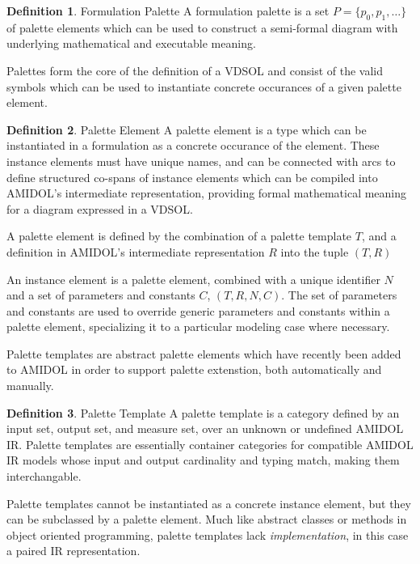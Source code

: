 \documentclass[11pt]{article}
\theoremstyle{definition}
\newtheorem{definition}{Definition}[section]
\newcommand{\amidol}{\textsc{AMIDOL}}
\begin{document}
\begin{definition}{Formulation Palette}
  A formulation palette is a set $P = \{ p_0, p_1, \ldots\}$ of
  palette elements which can be used to construct a semi-formal
  diagram with underlying mathematical and executable meaning.
\end{definition}

Palettes form the core of the definition of a VDSOL and consist of
the valid symbols which can be used to instantiate concrete occurances
of a given palette element.

\begin{definition}{Palette Element}
  A palette element is a type which can be instantiated in a
  formulation as a concrete occurance of the element.  These instance
  elements must have unique names, and can be connected with arcs to
  define structured co-spans of instance elements which can be
  compiled into \amidol{}'s intermediate representation, providing
  formal mathematical meaning for a diagram expressed in a VDSOL.

  A palette element is defined by the combination of a palette
  template $T$, and a definition in \amidol{}'s intermediate
  representation $R$ into the tuple $(T,R)$

  An instance element is a palette element, combined with a unique
  identifier $N$ and a set of parameters and constants $C$, $(T, R, N,
  C)$.  The set of parameters and constants are used to override
  generic parameters and constants within a palette element,
  specializing it to a particular modeling case where necessary.
\end{definition}

Palette templates are abstract palette elements which have recently
been added to \amidol{} in order to support palette extenstion, both
automatically and manually.

\begin{definition}{Palette Template}
  A palette template is a category defined by an input set, output
  set, and measure set, over an unknown or undefined \amidol{} IR.
  Palette templates are essentially container categories for
  compatible \amidol{} IR models whose input and output cardinality
  and typing match, making them interchangable.
\end{definition}

Palette templates cannot be instantiated as a concrete instance
element, but they can be subclassed by a palette element.  Much like
abstract classes or methods in object oriented programming, palette
templates lack \emph{implementation}, in this case a paired IR representation.
\end{document}
